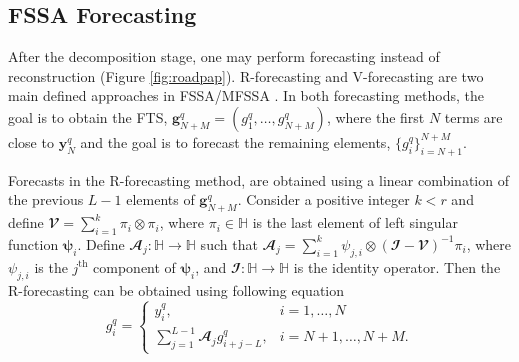 \subsection{FSSA Forecasting}\label{subsec:forecast}
After the decomposition stage, one may perform forecasting instead of reconstruction (Figure \ref{fig:roadpap}). R-forecasting and V-forecasting are two main defined approaches in FSSA/MFSSA \citep{trinka2023functional}. In both forecasting methods, the goal is to obtain the FTS, $\mathbf{g}_{N+M}^{q}=\left(g_{1}^{q},\dots,g_{N+M}^{q}\right)$, where the first $N$ terms are close to $\mathbf{y}_{N}^{q}$ and the goal is to forecast the remaining elements, $\{g_{i}^{q}\}_{i=N+1}^{N+M}$.

Forecasts in the R-forecasting method, are obtained using a linear combination of the previous $L-1$ elements of $\mathbf{g}_{N+M}^{q}$. Consider a positive integer $k<r$ and define $\mathbfcal{V} = \sum_{i=1}^{k} \pi_{i} \otimes \pi_{i}$, where $\pi_{i} \in \mathbb{H}$ is the last element of left singular function $\pmb{\psi}_{i}$. Define $\mathbfcal{A}_{j}: \mathbb{H} \rightarrow \mathbb{H}$ such that $\mathbfcal{A}_{j} = \sum_{i=1}^{k}\psi_{j,i} \otimes \left(\mathbfcal{I} - \mathbfcal{V}\right)^{-1}\pi_{i}$, where $\psi_{j,i}$ is the $j^{\text{th}}$ component of $\pmb{\psi}_{i}$, and $\mathbfcal{I}:\mathbb{H} \rightarrow \mathbb{H}$ is the identity operator. Then the R-forecasting can be obtained using following equation
\begin{equation}
	g_{i}^{q}=\begin{cases} 
		y_{i}^{q}, & i=1,\dots,N \\
		\sum_{j=1}^{L-1}\mathbfcal{A}_{j}g_{i+j-L}^{q}, & i=N+1,\dots,N+M.
	\end{cases}
\end{equation}

